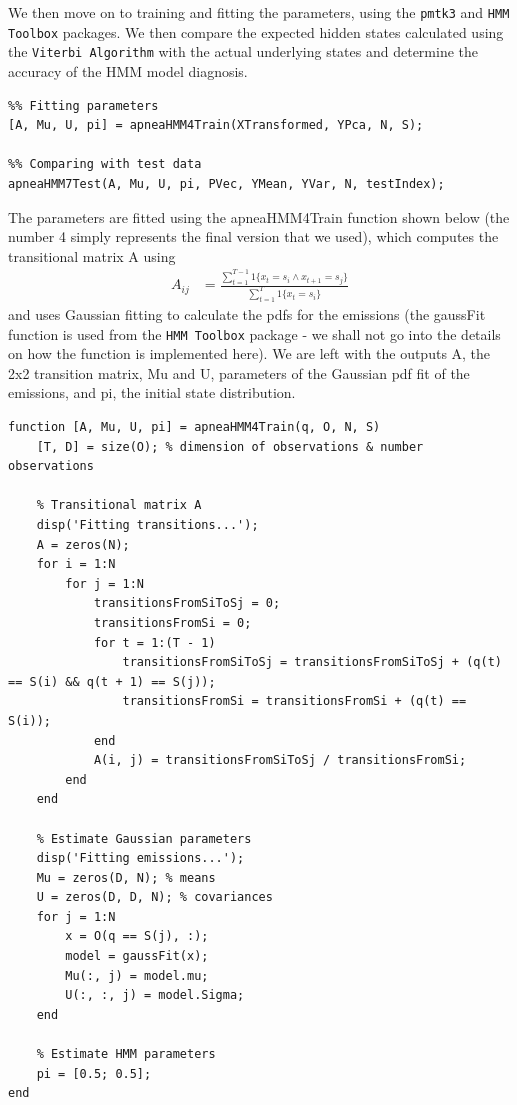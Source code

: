 We then move on to training and fitting the parameters, using the \verb!pmtk3! and \verb!HMM Toolbox! packages. We then compare the expected hidden states calculated using the \verb!Viterbi Algorithm! with the actual underlying states and determine the accuracy of the HMM model diagnosis.
\begin{lstlisting}
%% Fitting parameters
[A, Mu, U, pi] = apneaHMM4Train(XTransformed, YPca, N, S);

%% Comparing with test data
apneaHMM7Test(A, Mu, U, pi, PVec, YMean, YVar, N, testIndex);
\end{lstlisting}

The parameters are fitted using the apneaHMM4Train function shown below (the number 4 simply represents the final version that we used), which computes the transitional matrix A using
\begin{align}
		A_{ij} & = \frac{\sum_{t = 1}^{T - 1} 1\{x_t = s_i \land x_{t + 1} = s_j\}}{\sum_{t = 1}^{T} 1\{x_t = s_i\}}
\end{align}
and uses Gaussian fitting to calculate the pdfs for the emissions (the gaussFit function is used from the \verb!HMM Toolbox! package - we shall not go into the details on how the function is implemented here). We are left with the outputs A, the 2x2 transition matrix, Mu and U, parameters of the Gaussian pdf fit of the emissions, and pi, the initial state distribution.
 
\begin{lstlisting}
function [A, Mu, U, pi] = apneaHMM4Train(q, O, N, S)
    [T, D] = size(O); % dimension of observations & number observations

    % Transitional matrix A
    disp('Fitting transitions...');
    A = zeros(N);
    for i = 1:N
        for j = 1:N
            transitionsFromSiToSj = 0;
            transitionsFromSi = 0;
            for t = 1:(T - 1)
                transitionsFromSiToSj = transitionsFromSiToSj + (q(t) == S(i) && q(t + 1) == S(j));
                transitionsFromSi = transitionsFromSi + (q(t) == S(i));
            end
            A(i, j) = transitionsFromSiToSj / transitionsFromSi;
        end
    end

    % Estimate Gaussian parameters
    disp('Fitting emissions...');
    Mu = zeros(D, N); % means
    U = zeros(D, D, N); % covariances
    for j = 1:N
        x = O(q == S(j), :);
        model = gaussFit(x);
        Mu(:, j) = model.mu;
        U(:, :, j) = model.Sigma;
    end

    % Estimate HMM parameters
    pi = [0.5; 0.5];
end
\end{lstlisting}

